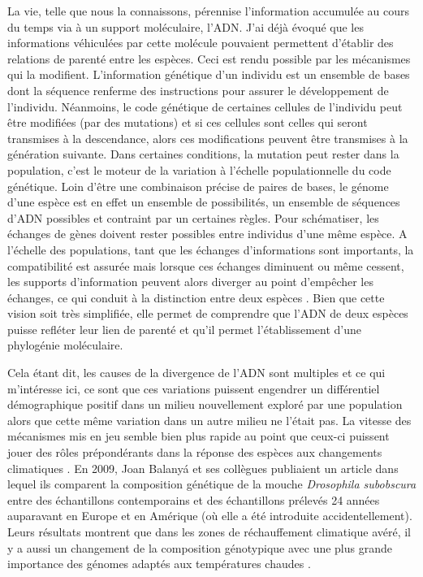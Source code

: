 La vie, telle que nous la connaissons, pérennise l'information accumulée
au cours du temps via à un support moléculaire, l'ADN. J'ai déjà évoqué
que les informations véhiculées par cette molécule pouvaient permettent
d'établir des relations de parenté entre les espèces. Ceci est rendu
possible par les mécanismes qui la modifient. L'information génétique
d'un individu est un ensemble de bases dont la séquence renferme des
instructions pour assurer le développement de l'individu. Néanmoins, le
code génétique de certaines cellules de l'individu peut être modifiées
(par des mutations) et si ces cellules sont celles qui seront transmises
à la descendance, alors ces modifications peuvent être transmises à la
génération suivante. Dans certaines conditions, la mutation peut rester
dans la population, c'est le moteur de la variation à l'échelle
populationnelle du code génétique. Loin d'être une combinaison précise
de paires de bases, le génome d'une espèce est en effet un ensemble de
possibilités, un ensemble de séquences d'ADN possibles et contraint par
un certaines règles. Pour schématiser, les échanges de gènes doivent
rester possibles entre individus d'une même espèce. A l'échelle des
populations, tant que les échanges d'informations sont importants, la
compatibilité est assurée mais lorsque ces échanges diminuent ou même
cessent, les supports d'information peuvent alors diverger au point
d'empêcher les échanges, ce qui conduit à la distinction entre deux
espèces \citep{Coyne2004}. Bien que cette vision soit très simplifiée,
elle permet de comprendre que l'ADN de deux espèces puisse refléter leur
lien de parenté et qu'il permet l'établissement d'une phylogénie
moléculaire.

Cela étant dit, les causes de la divergence de l'ADN sont multiples et
ce qui m'intéresse ici, ce sont que ces variations puissent engendrer un
différentiel démographique positif dans un milieu nouvellement exploré
par une population alors que cette même variation dans un autre milieu
ne l'était pas. La vitesse des mécanismes mis en jeu semble bien plus
rapide au point que ceux-ci puissent jouer des rôles prépondérants dans
la réponse des espèces aux changements climatiques \citep{Lavergne2010}.
En 2009, Joan Balanyá et ses collègues publiaient un article dans lequel
ils comparent la composition génétique de la mouche \emph{Drosophila
subobscura} entre des échantillons contemporains et des échantillons
prélevés 24 années auparavant en Europe et en Amérique (où elle a été
introduite accidentellement). Leurs résultats montrent que dans les
zones de réchauffement climatique avéré, il y a aussi un changement de
la composition génotypique avec une plus grande importance des génomes
adaptés aux températures chaudes \citep{Balanya2006}.

